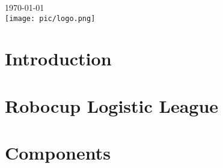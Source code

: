 \documentclass[12pt]{report}
\begin{document}
\begin{titlepage}


{\large \today}\\[2cm] %


\texttt{[image: pic/logo.png]}\\[1cm] %
 

\vfill %

\end{titlepage}

\tableofcontents
\listoffigures
\listoftables


\begin{abstract}
	
\end{abstract}

\chapter{Introduction}
	

\chapter{Robocup Logistic League}
	

\chapter{Components}
\end{document}
